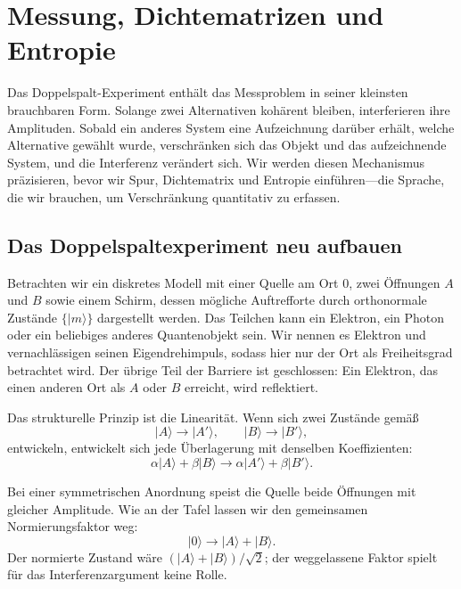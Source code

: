 \chapter{Messung, Dichtematrizen und Entropie}

Das Doppelspalt-Experiment enthält das Messproblem in seiner kleinsten brauchbaren Form. Solange zwei Alternativen kohärent bleiben, interferieren ihre Amplituden. Sobald ein anderes System eine Aufzeichnung darüber erhält, welche Alternative gewählt wurde, verschränken sich das Objekt und das aufzeichnende System, und die Interferenz verändert sich. Wir werden diesen Mechanismus präzisieren, bevor wir Spur, Dichtematrix und Entropie einführen---die Sprache, die wir brauchen, um Verschränkung quantitativ zu erfassen.

\section{Das Doppelspaltexperiment neu aufbauen}

Betrachten wir ein diskretes Modell mit einer Quelle am Ort \(0\), zwei Öffnungen \(A\) und \(B\) sowie einem Schirm, dessen mögliche Auftrefforte durch orthonormale Zustände \(\{|m\rangle\}\) dargestellt werden. Das Teilchen kann ein Elektron, ein Photon oder ein beliebiges anderes Quantenobjekt sein. Wir nennen es Elektron und vernachlässigen seinen Eigendrehimpuls, sodass hier nur der Ort als Freiheitsgrad betrachtet wird. Der übrige Teil der Barriere ist geschlossen: Ein Elektron, das einen anderen Ort als \(A\) oder \(B\) erreicht, wird reflektiert.

Das strukturelle Prinzip ist die Linearität. Wenn sich zwei Zustände gemäß
\begin{equation}
|A\rangle\longrightarrow |A'\rangle,
\qquad
|B\rangle\longrightarrow |B'\rangle,
\end{equation}
entwickeln, entwickelt sich jede Überlagerung mit denselben Koeffizienten:
\begin{equation}
\alpha|A\rangle+\beta|B\rangle
\longrightarrow
\alpha|A'\rangle+\beta|B'\rangle.
\end{equation}

Bei einer symmetrischen Anordnung speist die Quelle beide Öffnungen mit gleicher Amplitude. Wie an der Tafel lassen wir den gemeinsamen Normierungsfaktor weg:
\begin{equation}
|0\rangle\longrightarrow |A\rangle+|B\rangle.
\end{equation}
Der normierte Zustand wäre \((|A\rangle+|B\rangle)/\sqrt{2}\); der weggelassene Faktor spielt für das Interferenzargument keine Rolle.

